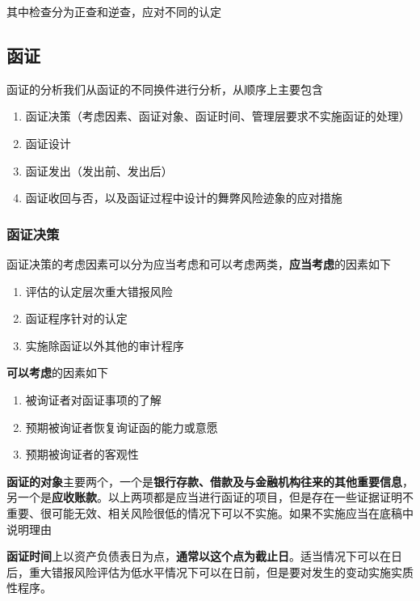 \documentclass[UTF8,12pt]{ctexart}
\numberwithin{equation}{section} %
\numberwithin{figure}{section}
\numberwithin{table}{section}
\begin{document}
	其中检查分为正查和逆查，应对不同的认定
	
	\subsection{函证}
	函证的分析我们从函证的不同换件进行分析，从顺序上主要包含
	\begin{enumerate}
		\item 函证决策（考虑因素、函证对象、函证时间、管理层要求不实施函证的处理）
		
		\item 函证设计
		
		\item 函证发出（发出前、发出后）
		
		\item 函证收回与否，以及函证过程中设计的舞弊风险迹象的应对措施
	\end{enumerate}
	
	\subsubsection{函证决策}
	函证决策的考虑因素可以分为应当考虑和可以考虑两类，\textbf{应当考虑}的因素如下
	\begin{enumerate}
		\item 评估的认定层次重大错报风险
		
		\item 函证程序针对的认定
		
		\item 实施除函证以外其他的审计程序
	\end{enumerate}
	
	\textbf{可以考虑}的因素如下
	\begin{enumerate}
		\item 被询证者对函证事项的了解
		
		\item 预期被询证者恢复询证函的能力或意愿
		
		\item 预期被询证者的客观性
	\end{enumerate}
	
	\textbf{函证的对象}主要两个，一个是\textbf{银行存款、借款及与金融机构往来的其他重要信息}，另一个是\textbf{应收账款}。以上两项都是应当进行函证的项目，但是存在一些证据证明不重要、很可能无效、相关风险很低的情况下可以不实施。如果不实施应当在底稿中说明理由
	
	\textbf{函证时间}上以资产负债表日为点，\textbf{通常以这个点为截止日}。适当情况下可以在日后，重大错报风险评估为低水平情况下可以在日前，但是要对发生的变动实施实质性程序。
	
\end{document}
